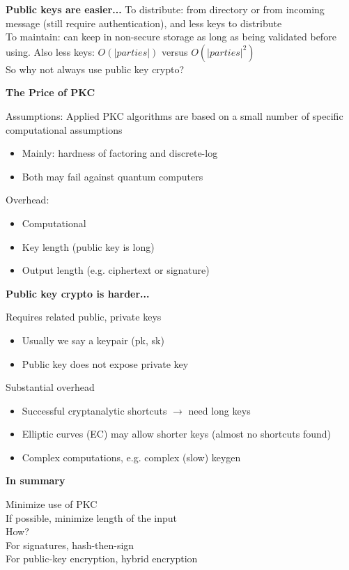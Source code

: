 \documentclass{article}
\begin{document}
\textbf{Public keys are easier...}
To distribute: from directory or from incoming message (still require authentication), and less keys to distribute\\
To maintain: can keep in non-secure storage as long as being validated before using. Also less keys: $O(|parties|)$ versus $O(|parties|^2)$\\
So why not always use public key crypto?

\textbf{The Price of PKC}

Assumptions:
Applied PKC algorithms are based on a small number of specific computational assumptions\begin{itemize}
	\item Mainly: hardness of factoring and discrete-log
	\item Both may fail against quantum computers
\end{itemize}
Overhead:\begin{itemize}
	\item Computational
	\item Key length (public key is long)
	\item Output length (e.g. ciphertext or signature)
\end{itemize}

\textbf{Public key crypto is harder...}

Requires related public, private keys\begin{itemize}
	\item Usually we say a keypair (pk, sk)
	\item Public key does not expose private key
\end{itemize}
Substantial overhead\begin{itemize}
	\item Successful cryptanalytic shortcuts $\rightarrow$ need long keys
	\item Elliptic curves (EC) may allow shorter keys (almost no shortcuts found)
	\item Complex computations, e.g. complex (slow) keygen
\end{itemize}

\textbf{In summary}

Minimize use of PKC\\
If possible, minimize length of the input\\
How?\\
For signatures, hash-then-sign\\
For public-key encryption, hybrid encryption
\end{document}
